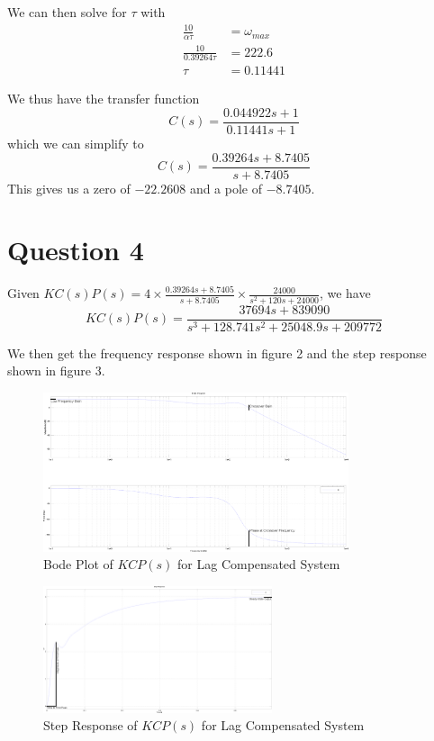 \documentclass[12pt]{article}
\begin{document}
We can then solve for $\tau$ with
\begin{align*}
\frac{10}{\alpha\tau} &= \omega_{max} \\
\frac{10}{0.39264\tau} &= 222.6 \\
\tau &= 0.11441
\end{align*}

We thus have the transfer function \[ C(s) = \frac{0.044922s + 1}{0.11441s + 1} \] which we can simplify to \[ C(s) = \frac{0.39264s + 8.7405}{s + 8.7405} \] This gives us a zero of $-22.2608$ and a pole of $-8.7405$.

\section{Question 4}
Given $KC(s)P(s) = 4 \times \frac{0.39264s + 8.7405}{s + 8.7405} \times \frac{24000}{s^2 + 120s + 24000}$, we have \[ KC(s)P(s) = \frac{37694s + 839090}{s^3 + 128.741s^2 + 25048.9s + 209772} \]

We then get the frequency response shown in figure 2 and the step response shown in figure 3.

\begin{figure}[ht]
\centering
\includegraphics[width=0.8\textwidth]{lab5-lag-bode.png}
\caption{Bode Plot of $KCP(s)$ for Lag Compensated System}
\end{figure}

\begin{figure}[ht]
\centering
\includegraphics[width=0.6\textwidth]{lab5-lag-step.png}
\caption{Step Response of $KCP(s)$ for Lag Compensated System}
\end{figure}
\end{document}
